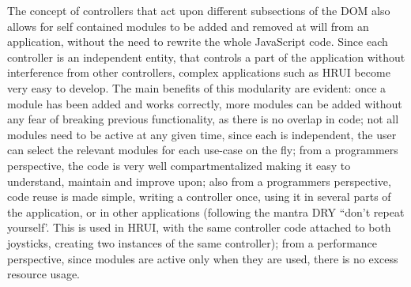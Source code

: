 The concept of controllers that act upon different subsections of the DOM also allows for self contained modules to be added and removed
at will from an application, without the need to rewrite the whole JavaScript code. Since each controller is an independent entity, that
controls a part of the application without interference from other controllers, complex applications such as HRUI become very easy to
develop. The main benefits of this modularity are evident: once a module has been added and works correctly, more modules can be added
without any fear of breaking previous functionality, as there is no overlap in code; not all modules need to be active at any given
time, since each is independent, the user can select the relevant modules for each use-case on the fly; from a programmers perspective,
the code is very well compartmentalized making it easy to understand, maintain and improve upon; also from a programmers perspective,
code reuse is made simple, writing a controller once, using it in several parts of the application, or in other applications (following
the mantra DRY ``don't repeat yourself'. This is used in HRUI, with the same controller code attached to both joysticks, creating two
instances of the same controller); from a performance perspective, since modules are active only when they are used, there is no excess
resource usage.\\

